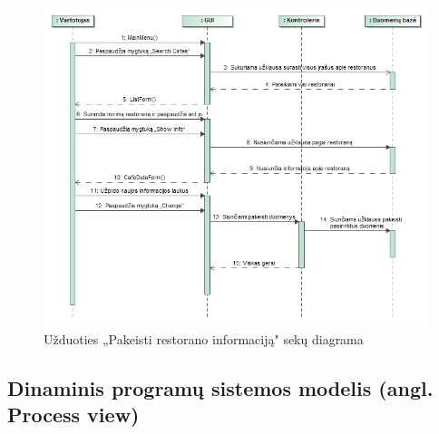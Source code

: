 \documentclass{VUMIFPSkursinis}
\begin{document}
\begin{figure}[H]
	\centering
	\includegraphics[width=\textwidth,height=\textheight,keepaspectratio]{img/ChangeInfo}
	\caption{Užduoties „Pakeisti restorano informaciją" sekų diagrama}
	\label{img:ChangeInfo}
\end{figure}

\subsection{Dinaminis programų sistemos modelis (angl. Process view)}
\end{document}
